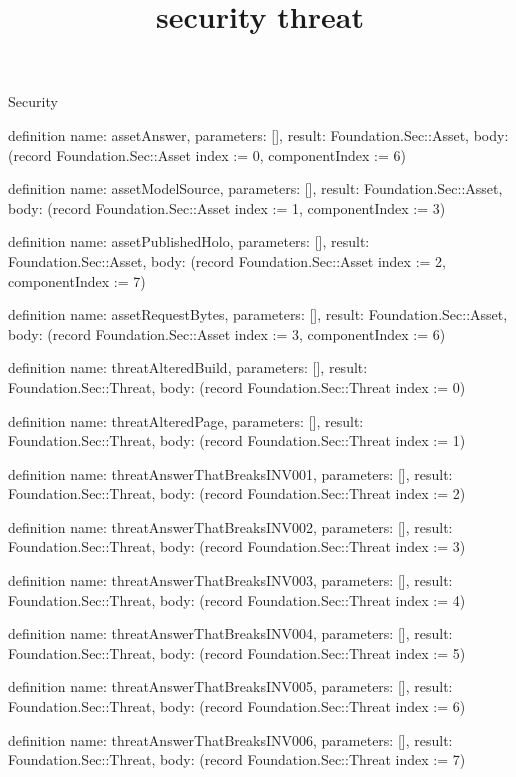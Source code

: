 \begin{lexlean}{Security}
\title{security threat}
\begin{semanticmodule}
definition{
  name: assetAnswer,
  parameters: [],
  result: Foundation.Sec::Asset,
  body: (record Foundation.Sec::Asset {index := 0, componentIndex := 6})
}

definition{
  name: assetModelSource,
  parameters: [],
  result: Foundation.Sec::Asset,
  body: (record Foundation.Sec::Asset {index := 1, componentIndex := 3})
}

definition{
  name: assetPublishedHolo,
  parameters: [],
  result: Foundation.Sec::Asset,
  body: (record Foundation.Sec::Asset {index := 2, componentIndex := 7})
}

definition{
  name: assetRequestBytes,
  parameters: [],
  result: Foundation.Sec::Asset,
  body: (record Foundation.Sec::Asset {index := 3, componentIndex := 6})
}

definition{
  name: threatAlteredBuild,
  parameters: [],
  result: Foundation.Sec::Threat,
  body: (record Foundation.Sec::Threat {index := 0})
}

definition{
  name: threatAlteredPage,
  parameters: [],
  result: Foundation.Sec::Threat,
  body: (record Foundation.Sec::Threat {index := 1})
}

definition{
  name: threatAnswerThatBreaksINV001,
  parameters: [],
  result: Foundation.Sec::Threat,
  body: (record Foundation.Sec::Threat {index := 2})
}

definition{
  name: threatAnswerThatBreaksINV002,
  parameters: [],
  result: Foundation.Sec::Threat,
  body: (record Foundation.Sec::Threat {index := 3})
}

definition{
  name: threatAnswerThatBreaksINV003,
  parameters: [],
  result: Foundation.Sec::Threat,
  body: (record Foundation.Sec::Threat {index := 4})
}

definition{
  name: threatAnswerThatBreaksINV004,
  parameters: [],
  result: Foundation.Sec::Threat,
  body: (record Foundation.Sec::Threat {index := 5})
}

definition{
  name: threatAnswerThatBreaksINV005,
  parameters: [],
  result: Foundation.Sec::Threat,
  body: (record Foundation.Sec::Threat {index := 6})
}

definition{
  name: threatAnswerThatBreaksINV006,
  parameters: [],
  result: Foundation.Sec::Threat,
  body: (record Foundation.Sec::Threat {index := 7})
}


\end{semanticmodule}
\end{lexlean}
